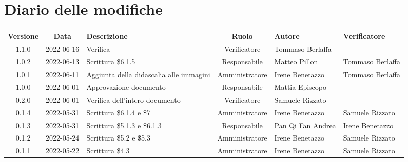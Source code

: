 \section*{Diario delle modifiche}
	\begin{center}
	\renewcommand{\arraystretch}{1.8} %
	\begin{longtable}{ |c|c|p{8em}|c|m{5em}|m{5em}| }
	\hline
	\textbf{Versione} & \textbf{Data} & \textbf{Descrizione} &  \textbf{Ruolo} &  \textbf{Autore} & \textbf{Verificatore}\\ %
	\hline %
	1.1.0 & 2022-06-16 & Verifica & Verificatore & Tommaso \newline Berlaffa & \\
	\hline 
  1.0.2 & 2022-06-13 & Scrittura \$6.1.5 & Responsabile & Matteo \newline Pillon & Tommaso \newline Berlaffa\\
	\hline 
	1.0.1 & 2022-06-11 & Aggiunta della didascalia alle immagini & Amministratore & Irene \newline Benetazzo & Tommaso \newline Berlaffa\\
	\hline 
	1.0.0 & 2022-06-01 & Approvazione documento & Responsabile & Mattia \newline Episcopo & \\
	\hline 
	0.2.0 & 2022-06-01 & Verifica dell'intero documento & Verificatore & Samuele \newline Rizzato & \\
	\hline 
	0.1.4 & 2022-05-31 & Scrittura \$6.1.4 e \$7 & Amministratore & Irene \newline Benetazzo & Samuele \newline Rizzato\\
	\hline 
	0.1.3 & 2022-05-31 & Scrittura \$5.1.3 e \$6.1.3 & Responsabile & Pan Qi Fan \newline Andrea & Irene \newline Benetazzo \\
	\hline
	0.1.2 & 2022-05-24 & Scrittura \$5.2 e \$5.3 & Amministratore & Irene \newline Benetazzo & Samuele \newline Rizzato \\
	\hline
	0.1.1 & 2022-05-22 & Scrittura \$4.3 & Amministratore & Irene \newline Benetazzo & Samuele \newline Rizzato \\

\end{longtable}
\end{center}
